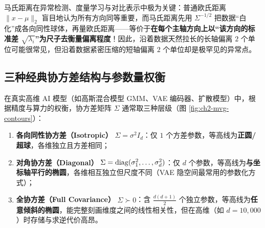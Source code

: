 马氏距离在异常检测、度量学习与对比表示中极为关键：普通欧氏距离 $\|x-\mu\|_2$ 盲目地认为所有方向同等重要，而马氏距离先用 $\Sigma^{-1/2}$ 把数据“白化”成各向同性球体，再量欧氏距离——等价于\textbf{在每个主轴方向上以“该方向的标准差 $\sqrt{\lambda_i}$”为尺子去衡量偏离程度}！因此，沿着数据天然拉长的长轴偏离 $2$ 个单位可能很常见，但沿着数据紧密压缩的短轴偏离 $2$ 个单位却是极罕见的异常点。

\subsection{三种经典协方差结构与参数量权衡}

在真实高维 AI 模型（如高斯混合模型 GMM、VAE 编码器、扩散模型）中，根据精度与算力的权衡，协方差矩阵 $\Sigma$ 通常取三种层级（图 \ref{fig:ch2-mvg-contours}）：
\begin{enumerate}
  \item \textbf{各向同性协方差（Isotropic）} $\Sigma = \sigma^2 I_d$：仅 $1$ 个方差参数，等高线为\textbf{正圆/超球}，各维独立且方差相同；
  \item \textbf{对角协方差（Diagonal）} $\Sigma = \operatorname{diag}(\sigma_1^2, \dots, \sigma_d^2)$：仅 $d$ 个参数，等高线为\textbf{与坐标轴平行的椭圆}，各维相互独立但尺度不同（VAE 隐空间最常用的参数化方式）；
  \item \textbf{全协方差（Full Covariance）} $\Sigma \succ 0$：含 $\frac{d(d+1)}{2}$ 个独立参数，等高线为\textbf{任意倾斜的椭圆}，能完整刻画维度之间的线性相关性，但在高维（如 $d = 10{,}000$）时存储与求逆代价高昂。
\end{enumerate}

